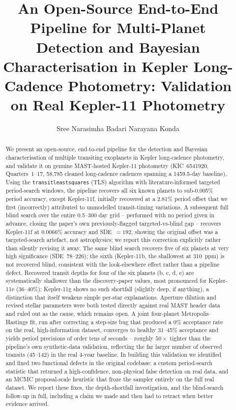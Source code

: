 \documentclass[11pt]{article}
\title{\textbf{An Open-Source End-to-End Pipeline for Multi-Planet Detection and Bayesian Characterisation in Kepler Long-Cadence Photometry: Validation on Real Kepler-11 Photometry}}
\author[1]{Sree Narasimha Badari Narayana Konda}
\affil[1]{Independent Researcher, India}
\date{}
\begin{document}
\maketitle

\begin{abstract}
\noindent
We present an open-source, end-to-end pipeline for the detection and Bayesian characterisation of multiple transiting exoplanets in Kepler long-cadence photometry, and validate it on genuine MAST-hosted Kepler-11 photometry (KIC~6541920, Quarters~1--17, 58{,}785 cleaned long-cadence cadences spanning a 1459.5-day baseline). Using the \texttt{transitleastsquares} (TLS) algorithm with literature-informed targeted period-search windows, the pipeline recovers all six known planets to sub-0.005\% period accuracy, except Kepler-11f, initially recovered at a 2.81\% period offset that we first (incorrectly) attributed to unmodelled transit-timing variations. A subsequent full blind search over the entire 0.5--300 day grid -- performed with no period given in advance, closing the paper's own previously-flagged targeted-vs-blind gap -- recovers Kepler-11f at 0.0066\% accuracy and SDE~$=192$, showing the original offset was a targeted-search artefact, not astrophysics; we report this correction explicitly rather than silently revising it away. The same blind search recovers five of six planets at very high significance (SDE~78--226); the sixth (Kepler-11b, the shallowest at 310~ppm) is not recovered blind, consistent with the look-elsewhere effect rather than a pipeline defect. Recovered transit depths for four of the six planets (b, c, d, e) are systematically shallower than the discovery-paper values, most pronounced for Kepler-11e (36--40\%); Kepler-11g shows no such shortfall (slightly deep, if anything), a distinction that itself weakens simple per-star explanations. Aperture dilution and revised stellar parameters were both tested directly against real MAST header data and ruled out as the cause, which remains open. A joint four-planet Metropolis--Hastings fit, run after correcting a step-size bug that produced a 0\% acceptance rate on the real, high-information dataset, converges to healthy 31--45\% acceptance and yields period precisions of order tens of seconds -- roughly $50\times$ tighter than the pipeline's own synthetic-data validation, reflecting the far larger number of observed transits (45--142) in the real 4-year baseline. In building this validation we identified and fixed two functional defects in the original codebase: a custom period-search statistic that returned a high-confidence, non-physical false detection on real data, and an MCMC proposal-scale heuristic that froze the sampler entirely on the full real dataset. We report these fixes, the depth-shortfall investigation, and the blind-search follow-up in full, including a claim we made and then had to retract when better evidence arrived.
\end{abstract}
\end{document}
